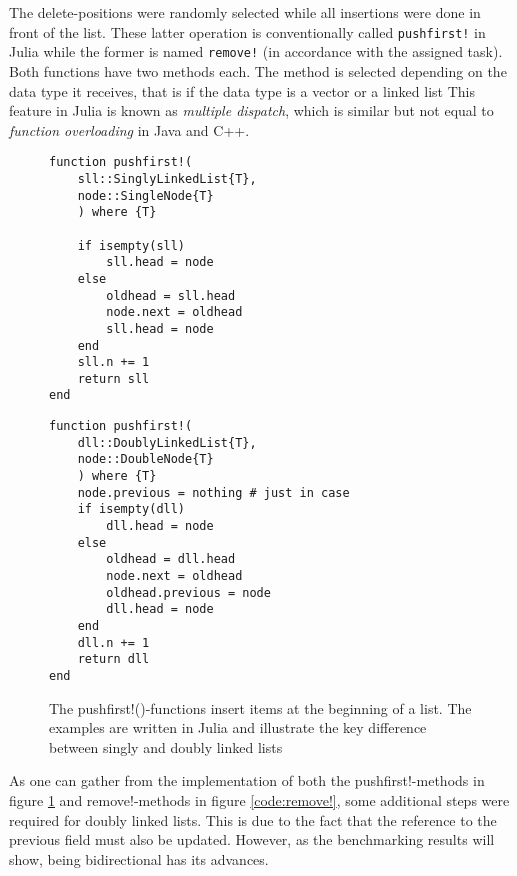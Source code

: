 \documentclass[a4paper, 11pt]{article}
\begin{document}
    The delete-positions were randomly selected while all insertions were done
    in front of the list. These latter operation is conventionally
    called \texttt{pushfirst!} in Julia while the former
    is named \texttt{remove!} (in accordance with the assigned task).
    Both functions have two methods each. 
    The method is selected depending on the data type it receives, 
    that is if the data type is a vector or a linked list 
    This feature in Julia is known as \emph{multiple dispatch}, 
    which is similar but not equal to \emph{function overloading} in Java and C++. 
    \begin{figure}[H]
    \centering
    \begin{verbatim}
function pushfirst!(
    sll::SinglyLinkedList{T}, 
    node::SingleNode{T}
    ) where {T} 

    if isempty(sll)
        sll.head = node
    else
        oldhead = sll.head
        node.next = oldhead
        sll.head = node
    end
    sll.n += 1
    return sll
end
    \end{verbatim}
    \begin{verbatim}
function pushfirst!(
    dll::DoublyLinkedList{T}, 
    node::DoubleNode{T}
    ) where {T}
    node.previous = nothing # just in case
    if isempty(dll)
        dll.head = node
    else
        oldhead = dll.head
        node.next = oldhead
        oldhead.previous = node
        dll.head = node
    end
    dll.n += 1
    return dll
end
    \end{verbatim}
    \caption{The pushfirst!()-functions insert items at the beginning of a list. The
    examples are written in Julia and illustrate the key difference between singly
    and doubly linked lists}
    \label{code:pushfirst!}
    \end{figure}
    As one can gather from the implementation of both the pushfirst!-methods in
    figure \ref{code:pushfirst!} and remove!-methods in figure
    \ref{code:remove!}, some additional steps were required for doubly linked lists. 
    This is due to
    the fact that the reference to the previous field must also be updated.
    However, as the benchmarking results will show, being bidirectional has its advances.  
    
\end{document}
